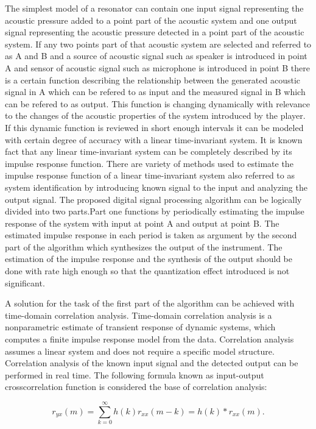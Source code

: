 \pa
The simplest model of a resonator can contain one input signal representing the acoustic pressure added to a point part of the acoustic system and one output signal representing the acoustic pressure detected in a point part of the acoustic system. If any two points part of that acoustic system are selected and referred to as A and B and a source of acoustic signal such as speaker is introduced in point A and sensor of acoustic signal such as microphone is introduced in point B there is a certain function describing the relationship between the generated acoustic signal in A which can be refered to as input and the measured signal in B which can be refered to as output. This function is changing dynamically with relevance to the changes of the acoustic properties of the system introduced by the player. If this dynamic function is reviewed in short enough intervals it can be modeled with certain degree of accuracy with a linear time-invariant system. It is known fact that any linear time-invariant system can be completely described by its impulse response function. There are variety of methods used to estimate the impulse response function of a linear time-invariant system also referred to as system identification by introducing known signal to the input and analyzing the output signal. The proposed digital signal processing algorithm can be logically divided into two parts.Part one functions by periodically estimating the impulse response of the system with input at point A and output at point B. The estimated impulse response in each period is taken as argument by the second part of the algorithm which synthesizes the output of the instrument. The estimation of the impulse response and the synthesis of the output should be done with rate high enough so that the quantization effect introduced is not significant.

\pa
A solution for the task of the first part of the algorithm can be achieved with time-domain correlation analysis. Time-domain correlation analysis is a nonparametric estimate of transient response of dynamic systems, which computes a finite impulse response model from the data. Correlation analysis assumes a linear system and does not require a specific model structure. Correlation analysis of the known input signal and the detected output can be performed in real time. The following formula known as input-output crosscorrelation function is considered the base of correlation analysis:

\pa
\begin{equation} {r}_{yx}(m) = \sum_{k=0}^\infty h(k) {r}_{xx}(m-k) = h(k) * {r}_{xx}(m). \end{equation}

